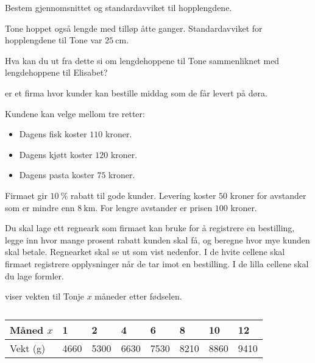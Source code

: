 \begin{oppgaver}
     Bestem gjennomsnittet og standardavviket til hopplengdene.
\end{oppgaver}

Tone hoppet også lengde med tilløp åtte ganger. Standardavviket for hopplengdene
til Tone var $\SI{25}{\cm}$.

\begin{oppgaver}
     Hva kan du ut fra dette si om lengdehoppene til Tone sammenliknet
    med lengdehoppene til Elisabet?
\end{oppgaver}

\Oppgave[5] %

 er et firma hvor kunder kan bestille middag som de får
levert på døra. \medskip

Kundene kan velge mellom tre retter:

\begin{itemize}
    \item Dagens fisk koster $110$ kroner.
    \item Dagens kjøtt koster $120$ kroner.
    \item Dagens pasta koster $75$ kroner.
\end{itemize}

Firmaet gir $\SI{10}{\percent}$ rabatt til gode kunder. Levering koster $50$
kroner for avstander som er mindre enn $\SI{8}{\km}$. For lengre avstander er
prisen $100$ kroner. \medskip

Du skal lage ett regneark som firmaet kan bruke for å registrere en bestilling,
legge inn hvor mange prosent rabatt kunden skal få, og beregne hvor mye kunden
skal betale. Regnearket skal se ut som vist nedenfor. I de hvite cellene skal
firmaet registrere opplysninger når de tar imot en bestilling. I de lilla
cellene skal du lage formler.

\Oppgave[9] %

 viser vekten til Tonje $x$ måneder etter fødselen.

\begin{table}[H]
    \caption{}
    \label{table:del-1-oppgave-2.7}
    \begin{tabularx}{\textwidth}{|l *{7}{Y}|} \hline \Rowcolor
        Måned $x$      &      1     &      2     &      4     &      6     &      8     &      10    &      12    \\ \hline
        Vekt (\si{\g}) & \num{4660} & \num{5300} & \num{6630} & \num{7530} & \num{8210} & \num{8860} & \num{9410} \\ \hline
    \end{tabularx}
\end{table}

